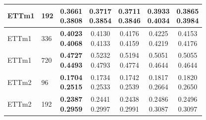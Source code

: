\begin{center}
\begin{minipage}{\textwidth}
\begin{tabular}{@{}llccccc@{}}
ETTm1 & 192 & \shortstack{\colorbox[gray]{0.82}{\textbf{0.3661}}\\\colorbox[gray]{0.82}{\textbf{0.3808}}} & \shortstack{0.3717\\0.3854} & \shortstack{\colorbox[gray]{0.92}{0.3711}\\\colorbox[gray]{0.92}{0.3846}} & \shortstack{0.3933\\0.4034} & \shortstack{0.3865\\0.3984} \\ \hline

ETTm1 & 336 & \shortstack{\colorbox[gray]{0.82}{\textbf{0.4023}}\\\colorbox[gray]{0.82}{\textbf{0.4068}}} & \shortstack{\colorbox[gray]{0.92}{0.4130}\\\colorbox[gray]{0.92}{0.4133}} & \shortstack{0.4176\\0.4159} & \shortstack{0.4225\\0.4219} & \shortstack{0.4153\\0.4176} \\ \hline

ETTm1 & 720 & \shortstack{\colorbox[gray]{0.82}{\textbf{0.4727}}\\\colorbox[gray]{0.82}{\textbf{0.4493}}} & \shortstack{0.5232\\0.4793} & \shortstack{0.5194\\0.4774} & \shortstack{\colorbox[gray]{0.92}{0.5051}\\\colorbox[gray]{0.92}{0.4644}} & \shortstack{0.5055\\\colorbox[gray]{0.92}{0.4644}} \\ \hline

ETTm2 & 96 & \shortstack{\colorbox[gray]{0.82}{\textbf{0.1704}}\\\colorbox[gray]{0.82}{\textbf{0.2515}}} & \shortstack{\colorbox[gray]{0.92}{0.1734}\\\colorbox[gray]{0.92}{0.2533}} & \shortstack{0.1742\\0.2539} & \shortstack{0.1817\\0.2664} & \shortstack{0.1820\\0.2650} \\ \hline

ETTm2 & 192 & \shortstack{\colorbox[gray]{0.82}{\textbf{0.2387}}\\\colorbox[gray]{0.82}{\textbf{0.2959}}} & \shortstack{0.2441\\0.2997} & \shortstack{\colorbox[gray]{0.92}{0.2438}\\\colorbox[gray]{0.92}{0.2991}} & \shortstack{0.2486\\0.3087} & \shortstack{0.2496\\0.3097} \\ \hline


\end{tabular}
\end{minipage}
\end{center}
